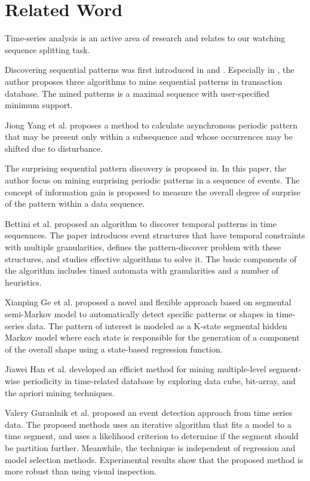 \section{Related Word}
Time-series analysis is an active area of research and relates to our watching sequence splitting task.

Discovering sequential patterns was first introduced in \cite{DBLP:conf/icde/AgrawalS95} and \cite{DBLP:conf/edbt/SrikantA96}. Especially in \cite{DBLP:conf/icde/AgrawalS95},
the author proposes three algorithms to mine sequential patterns in transaction database. The mined patterns is a maximal sequence with user-specified minimum support.

Jiong Yang et al.\cite{JYMINING} proposes a method to calculate asynchronous periodic pattern that may be present only within a subsequence and whose occurrences may be
shifted due to disturbance.

The surprising sequential pattern discovery is proposed in\cite{DBLP:conf/kdd/YangWY01}. In this paper, the author focus on mining surprising periodic patterns in a sequence of events. The concept of information gain is proposed to measure the overall degree of surprise of the pattern within a data sequence.

Bettini et al.\cite{Discover_Freq} proposed an algorithm to discover temporal patterns in time sequennces. The paper introduces event structures that have temporal constraints
with multiple granularities, defines the pattern-discover problem with these structures, and studies effective algorithms to solve it. The basic components of the algorithm
includes timed automata with granularities and a number of heuristics.

Xianping Ge et al.\cite{DBLP:conf/kdd/GeS00} proposed a novel and flexible approach based on segmental semi-Markov model to automatically detect specific patterns or shapes
in time-series data. The pattern of interest is modeled as a K-state segmental hidden Markov model where each state is responsible for the generation of a component of the
overall shape using a state-based regression function.

Jiawei Han et al.\cite{DBLP:conf/kdd/HanGY98} developed an efficiet method for mining multiple-level segment-wise periodicity in time-related database by exploring data cube,
bit-array, and the apriori mining techniques.

Valery Guranlnik et al.\cite{Guralnik:1999:EDT:312129.312190} proposed an event detection approach from time series data. The proposed methods uses  an iterative algorithm
that fits a model to a time segment, and uses a likelihood criterion to determine if the segment should be partition further. Meanwhile, the technique is independent of
regression and model selection methods. Experimental results show that the proposed method is more robust than using visual inspection.

